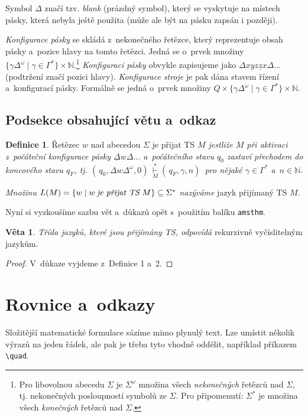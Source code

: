 \documentclass[a4paper, 11pt, twocolumn]{article}
\theoremstyle{definition}
\newtheorem{definition}{Definice}
\theoremstyle{definition}
\newtheorem{sentence}{Věta}
\begin{document}
Symbol $\Delta$ značí tzv. \emph{blank} (prázdný symbol), který se vyskytuje na místech pásky, která nebyla ještě použita (může ale být na pásku zapsán i později).

\emph{Konfigurace pásky} se skládá z~nekonečného řetězce,
který reprezentuje obsah pásky a~pozice hlavy na tomto řetězci. Jedná se o~prvek množiny $\{\gamma \Delta^\omega\mid\gamma\in\Gamma^*\}\times\mathbb{N}$.\footnote{Pro libovolnou abecedu $\Sigma$ je $\Sigma^\omega$ množina všech \emph{nekonečných} řetězců nad $\Sigma$, tj. nekonečných posloupností symbolů ze $\Sigma$. Pro připomenutí: $\Sigma^*$ je množina všech \emph{konečných} řetězců nad $\Sigma$.}
\emph{Konfiguraci pásky} obvykle zapisujeme jako $\Delta xyz\underline{z}x\Delta...$ (podtržení značí pozici hlavy). \emph{Konfigurace stroje} je pak dána stavem řízení a~konfigurací pásky. Formálně se jedná o~prvek množiny $Q\times\{\gamma\Delta^\omega\mid\gamma\in\Gamma^*\}\times\mathbb{N}$.

\subsection{Podsekce obsahující větu a~odkaz}
\begin{definition} \label{definice_2}
Řetězec $w$ nad abecedou $\Sigma$ je přijat TS \emph{$M$ jestliže $M$ při aktivaci z~počáteční konfigurace pásky $\underline{\Delta}w\Delta...$ a~počátečního stavu $q_0$ zastaví přechodem do koncového stavu $q_F$, tj. $( \,q_0,\Delta w\Delta^\omega,0) \, \overset{*}{\underset{M}{\vdash}} ( \,q_F,\gamma,n) \,$ pro nějaké $\gamma\in\Gamma^*$ a~$n\in\mathbb{N}$}.

\emph{Množinu} $L(M)=\{w \mid w\:\text{\emph{je přijat TS}}\:M\}\subseteq\Sigma^*$ \emph{nazýváme} jazyk přijímaný TS $M.$
\end{definition}
Nyní si vyzkoušíme sazbu vět a~důkazů opět s~použitím
balíku \verb|amsthm|.
\begin{sentence} \label{veta_1}
\emph{Třída jazyků, které jsou přijímány TS, odpovídá} rekurzivně vyčíslitelným jazykům.
\end{sentence}

\begin{proof} \label{dukaz_1}
	V~důkaze vyjdeme z~Definice 1 a~2.
\end{proof}

\section{Rovnice a~odkazy}
Složitější matematické formulace sázíme mimo plynulý text. Lze umístit několik výrazů na jeden řádek, ale pak je třeba tyto vhodně oddělit, například příkazem \verb|\quad|.\\
\end{document}
